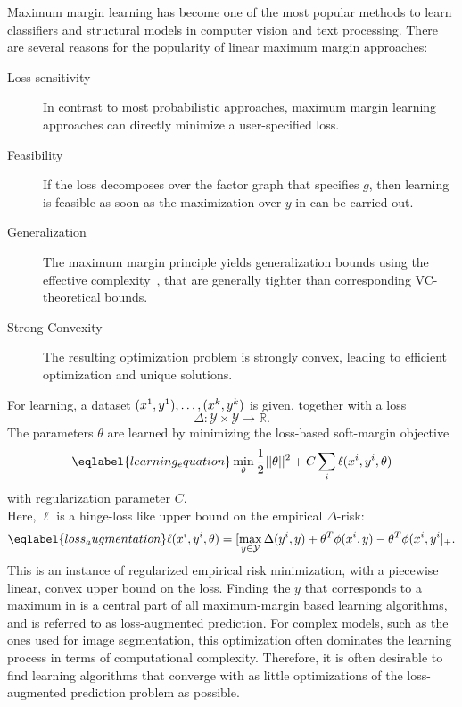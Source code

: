 Maximum margin learning has become one of the most popular methods to learn
classifiers and structural models in computer vision and text processing.
There are several reasons for the popularity of linear maximum margin approaches:
\begin{description}
    \item[Loss-sensitivity] In contrast to most probabilistic approaches, maximum margin learning approaches can directly
        minimize a user-specified loss.
    \item[Feasibility] If the loss decomposes over the factor graph that
        specifies $g$, then learning is feasible as soon as the maximization
        over $y$ in  can be carried out.
    \item[Generalization] The maximum margin principle yields generalization
        bounds using the effective complexity~\citep{taskar2003max}, that are generally
        tighter than corresponding VC-theoretical bounds.
    \item[Strong Convexity] The resulting optimization problem is strongly
        convex, leading to efficient optimization and unique solutions.
\end{description}

For learning, a dataset $(x^{1}, y^{1}),\dotsc,(x^{k}, y^{k})$ is given, together with a loss
\begin{equation}
    \Delta \colon \mathcal{Y} \times \mathcal{Y} \rightarrow \mathbb{R}.
\end{equation}
The parameters $\theta$ are learned by minimizing the loss-based soft-margin
objective
\begin{equation}\eqlabel{learning_equation}
    \min_\theta \frac{1}{2} ||\theta||^2 + C \sum_i  \ell(x\hoch{i}, y\hoch{i}, \theta)
\end{equation}
with regularization parameter $C$.\pagebreak\\
Here, $\ell$ is a hinge-loss like upper bound
on the empirical $\Delta$-risk:
\begin{equation}\eqlabel{loss_augmentation}
    \ell(x\hoch{i}, y\hoch{i}, \theta) = [\max_{y \in \mathcal{Y}} \Delta(y\hoch{i}, y) + \theta^T \phi(x\hoch{i}, y) - \theta^T \phi(x\hoch{i}, y\hoch{i}]_+.
\end{equation}
This is an instance of regularized empirical risk minimization, with a
piecewise linear, convex upper bound on the loss. 
Finding the $y$ that corresponds to a maximum in  is
a central part of all maximum-margin based learning algorithms, and is referred to
as loss-augmented prediction. For complex models, such as the ones used for
image segmentation, this optimization often dominates the learning process in
terms of computational complexity.
Therefore, it is often desirable to find learning algorithms that converge with
as little optimizations of the loss-augmented prediction problem as possible.

